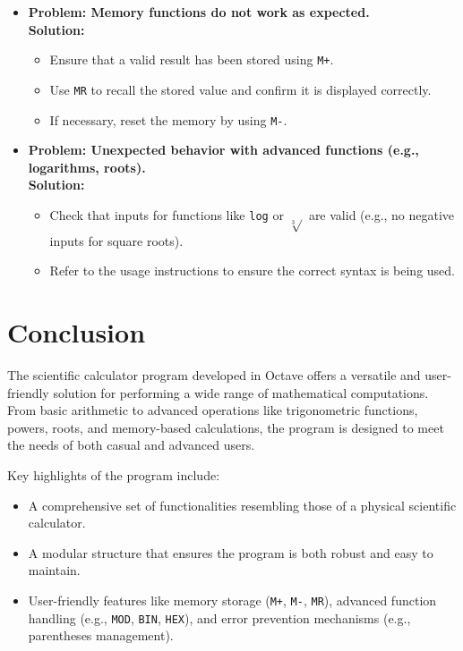 \documentclass[a4paper,12pt]{article}
\begin{document}
\begin{itemize}
    \item \textbf{Problem: Memory functions do not work as expected.} \\ 
    \textbf{Solution:}
    \begin{itemize}
        \item Ensure that a valid result has been stored using \texttt{M+}.
        \item Use \texttt{MR} to recall the stored value and confirm it is displayed correctly.
        \item If necessary, reset the memory by using \texttt{M-}.
    \end{itemize}

    \item \textbf{Problem: Unexpected behavior with advanced functions (e.g., logarithms, roots).} \\ 
    \textbf{Solution:}
    \begin{itemize}
        \item Check that inputs for functions like \texttt{log} or \texttt{\(\sqrt[3]{}\)} are valid (e.g., no negative inputs for square roots).
        \item Refer to the usage instructions to ensure the correct syntax is being used.
    \end{itemize}
\end{itemize}

\newpage
\section{Conclusion}

The scientific calculator program developed in Octave offers a versatile and user-friendly solution for performing a wide range of mathematical computations. From basic arithmetic to advanced operations like trigonometric functions, powers, roots, and memory-based calculations, the program is designed to meet the needs of both casual and advanced users.

Key highlights of the program include:
\begin{itemize}
    \item A comprehensive set of functionalities resembling those of a physical scientific calculator.
    \item A modular structure that ensures the program is both robust and easy to maintain.
    \item User-friendly features like memory storage (\texttt{M+}, \texttt{M-}, \texttt{MR}), advanced function handling (e.g., \texttt{MOD}, \texttt{BIN}, \texttt{HEX}), and error prevention mechanisms (e.g., parentheses management).
\end{itemize}
\end{document}
